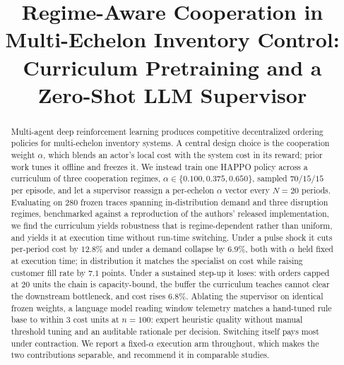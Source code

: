 \documentclass[conference]{IEEEtran}
\begin{document}
\title{Regime-Aware Cooperation in Multi-Echelon Inventory Control:\\
Curriculum Pretraining and a Zero-Shot LLM Supervisor}

\author{
}

\maketitle

\begin{abstract}
Multi-agent deep reinforcement learning produces competitive decentralized
ordering policies for multi-echelon inventory systems. A central design
choice is the cooperation weight $\alpha$, which blends an actor's local
cost with the system cost in its reward; prior work tunes it offline and
freezes it. We instead train one HAPPO policy across a curriculum of three
cooperation regimes, $\alpha \in \{0.100, 0.375, 0.650\}$, sampled
$70/15/15$ per episode, and let a supervisor reassign a per-echelon $\alpha$
vector every $N=20$ periods. Evaluating on 280 frozen traces spanning
in-distribution demand and three disruption regimes, benchmarked against a
reproduction of the authors' released implementation, we find the curriculum
yields
robustness that is regime-dependent rather than uniform, and yields it at
execution time without run-time switching. Under a pulse shock it cuts
per-period cost by $12.8\%$ and under a demand collapse by $6.9\%$, both
with $\alpha$ held fixed at execution time; in distribution it matches the
specialist on cost while raising customer fill rate by $7.1$ points. Under
a sustained step-up it loses: with orders capped at $20$ units the chain is
capacity-bound, the buffer the curriculum teaches cannot clear the
downstream bottleneck, and cost rises $6.8\%$. Ablating the supervisor on
identical frozen weights, a language model reading window telemetry matches
a hand-tuned rule base to within $3$ cost units at $n=100$: expert heuristic
quality without manual threshold tuning and an auditable rationale
per decision. Switching itself pays most under contraction.
We report a fixed-$\alpha$ execution arm throughout, which makes the two
contributions separable, and recommend it in comparable studies.
\end{abstract}
\end{document}
